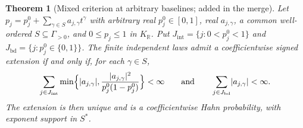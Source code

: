 \documentclass[11pt]{article}
\numberwithin{equation}{section}
\newtheorem{theorem}{Theorem}[section]
\theoremstyle{definition}
\theoremstyle{remark}
\newcommand{\R}{\mathbb R}
\newcommand{\KR}{K_{\R}}
\newcommand{\abs}[1]{\lvert#1\rvert}
\begin{document}
\begin{theorem}[Mixed criterion at arbitrary baselines; added in the merge]
\label{meas:nb:thm:mixed}
Let $p_j=p_j^0+\sum_{\gamma\in S}a_{j,\gamma}t^\gamma$ with arbitrary real $p_j^0\in[0,1]$,
real $a_{j,\gamma}$, a common well-ordered $S\subseteq\Gamma_{>0}$, and $0\le p_j\le1$ in
$\KR$. Put $J_{\mathrm{int}}=\{j:0<p_j^0<1\}$ and $J_{\mathrm{bd}}=\{j:p_j^0\in\{0,1\}\}$.
The finite independent laws admit a coefficientwise signed extension if and only
if, for each $\gamma\in S$,
\begin{equation}\label{meas:nb:eq:mixed}
 \sum_{j\in J_{\mathrm{int}}}\min\Bigl\{\abs{a_{j,\gamma}},
 \frac{\abs{a_{j,\gamma}}^2}{p_j^0(1-p_j^0)}\Bigr\}<\infty
 \qquad\text{and}\qquad
 \sum_{j\in J_{\mathrm{bd}}}\abs{a_{j,\gamma}}<\infty .
\end{equation}
The extension is then unique and is a coefficientwise Hahn probability, with
exponent support in $S^*$.
\end{theorem}
\end{document}
